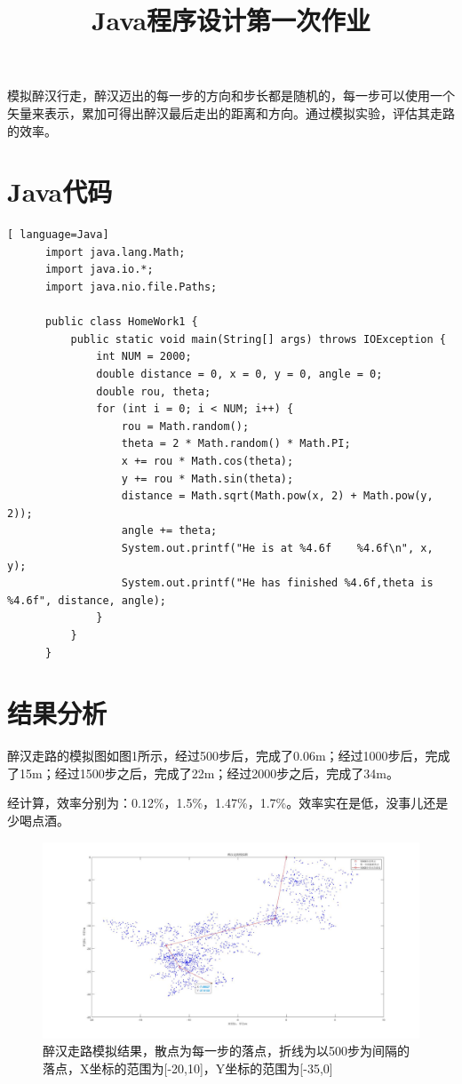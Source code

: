 \documentclass{article}
\begin{document}
\title{Java程序设计第一次作业}
\maketitle
模拟醉汉行走，醉汉迈出的每一步的方向和步长都是随机的，每一步可以使用一个矢量来表示，累加可得出醉汉最后走出的距离和方向。通过模拟实验，评估其走路的效率。


\section{Java代码}
\begin{lstlisting}[ language=Java]
      import java.lang.Math;
      import java.io.*;
      import java.nio.file.Paths;
      
      public class HomeWork1 {
          public static void main(String[] args) throws IOException {
              int NUM = 2000;
              double distance = 0, x = 0, y = 0, angle = 0;
              double rou, theta;
              for (int i = 0; i < NUM; i++) {
                  rou = Math.random();
                  theta = 2 * Math.random() * Math.PI;
                  x += rou * Math.cos(theta);
                  y += rou * Math.sin(theta);
                  distance = Math.sqrt(Math.pow(x, 2) + Math.pow(y, 2));
                  angle += theta;
                  System.out.printf("He is at %4.6f    %4.6f\n", x, y);
                  System.out.printf("He has finished %4.6f,theta is %4.6f", distance, angle);
              }
          }
      }
    \end{lstlisting}
\section{结果分析}
\qquad 醉汉走路的模拟图如图1所示，经过500步后，完成了0.06m；经过1000步后，完成了15m；经过1500步之后，完成了22m；经过2000步之后，完成了34m。

经计算，效率分别为：0.12\%，1.5\%，1.47\%，1.7\%。效率实在是低，没事儿还是少喝点酒。
\begin{figure}[!htbp]
\centering
\includegraphics[scale=0.3]{./醉汉.jpg}
\caption{醉汉走路模拟结果，散点为每一步的落点，折线为以500步为间隔的落点，X坐标的范围为[-20,10]，Y坐标的范围为[-35,0]}
\end{figure}
\end{document}
